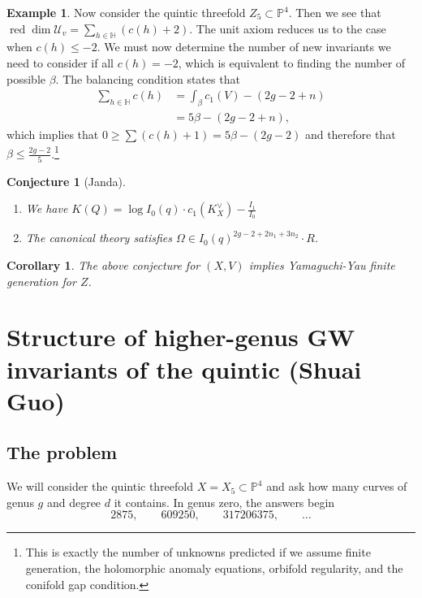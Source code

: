 \documentclass{amsart}
\newtheorem{cor}[thm]{Corollary}
\newtheorem{conj}[thm]{Conjecture}
\theoremstyle{definition}
\newtheorem{exm}[thm]{Example}
\theoremstyle{remark}
\theoremstyle{plain}
\theoremstyle{definition}
\theoremstyle{remark}
\renewcommand{\H}{\mathbb{H}}
\renewcommand{\P}{\mathbb{P}}
\newcommand{\mc}[1]{\mathcal{#1}}
\newcommand{\on}[1]{\operatorname{#1}}
\newcommand{\1}{\mathbf{1}}
\newcommand{\2}{\mathbf{2}}
\newcommand{\3}{\mathbf{3}}
\begin{document}
\begin{exm}
    Now consider the quintic threefold \(Z_5 \subset \P^4\). Then we see that \(\on{red}\dim \mc{U}_v = \sum_{h \in \H} (c(h)+2)\). The unit axiom reduces us to the case when \(c(h) \leq -2\). We must now determine the number of new invariants we need to consider if all \(c(h) = -2\), which is equivalent to finding the number of possible \(\beta\). The balancing condition states that
    \begin{align*}
        \sum_{h \in \H} c(h) &= \int_{\beta} c_1(V) - (2g-2+n) \\
        &= 5\beta - (2g-2+n),
    \end{align*}
    which implies that \(0 \geq \sum (c(h)+1) = 5\beta - (2g-2)\) and therefore that \(\beta \leq \frac{2g-2}{5}\).\footnote{This is exactly the number of unknowns predicted if we assume finite generation, the holomorphic anomaly equations, orbifold regularity, and the conifold gap condition.}
\end{exm}

\begin{conj}[Janda]\leavevmode
    \begin{enumerate}
        \item We have \(K(Q) = \log I_0(q) \cdot c_1(K_X^{\vee}) - \frac{I_1}{I_0}\) \\
        \item The canonical theory satisfies \(\Omega \in I_0(q)^{2g-2+2n_1 + 3 n_2} \cdot R\). 
    \end{enumerate}
\end{conj}

\begin{cor}
    The above conjecture for \((X, V)\) implies Yamaguchi-Yau finite generation for \(Z\).
\end{cor}

\section{Structure of higher-genus GW invariants of the quintic (Shuai Guo)}%
\label{sec:Structure of higher-genus GW invariants of the quintic (Shuai Guo)}

\subsection{The problem}%
\label{sub:The problem (Guo)}

We will consider the quintic threefold \(X = X_5 \subset \P^4\) and ask how many curves of genus \(g\) and degree \(d\) it contains. In genus zero, the answers begin
\[ 2875, \qquad 609250, \qquad 317206375, \qquad \ldots \]
\end{document}
